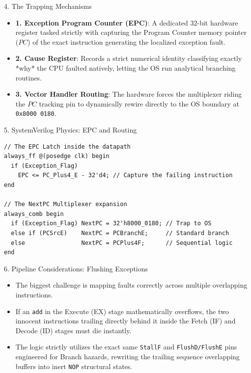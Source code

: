 \documentclass[aspectratio=169]{beamer}
\begin{document}
\begin{frame}{4. The Trapping Mechanisms}
\begin{itemize}
    \item \textbf{1. Exception Program Counter (EPC)}: A dedicated 32-bit hardware register tasked strictly with capturing the Program Counter memory pointer ($PC$) of the exact instruction generating the localized exception fault.
    \item \textbf{2. Cause Register}: Records a strict numerical identity classifying exactly *why* the CPU faulted natively, letting the OS run analytical branching routines.
    \item \textbf{3. Vector Handler Routing}: The hardware forces the multiplexer riding the $PC$ tracking pin to dynamically rewire directly to the OS boundary at \texttt{0x8000 0180}.
\end{itemize}
\end{frame}

\begin{frame}[fragile]{5. SystemVerilog Physics: EPC and Routing}
\begin{verbatim}
// The EPC Latch inside the datapath
always_ff @(posedge clk) begin
  if (Exception_Flag) 
    EPC <= PC_Plus4_E - 32'd4; // Capture the failing instruction
end

// The NextPC Multiplexer expansion
always_comb begin
  if (Exception_Flag) NextPC = 32'h8000_0180; // Trap to OS
  else if (PCSrcE)    NextPC = PCBranchE;     // Standard branch
  else                NextPC = PCPlus4F;      // Sequential logic
end
\end{verbatim}
\end{frame}

\begin{frame}{6. Pipeline Considerations: Flushing Exceptions}
\begin{itemize}
    \item The biggest challenge is mapping faults correctly across multiple overlapping instructions.
    \item If an \texttt{add} in the Execute (EX) stage mathematically overflows, the two innocent instructions trailing directly behind it inside the Fetch (IF) and Decode (ID) stages must die instantly.
    \item The logic strictly utilizes the exact same \texttt{StallF} and \texttt{FlushD/FlushE} pins engineered for Branch hazards, rewriting the trailing sequence overlapping buffers into inert \texttt{NOP} structural states.
\end{itemize}
\end{frame}
\end{document}

